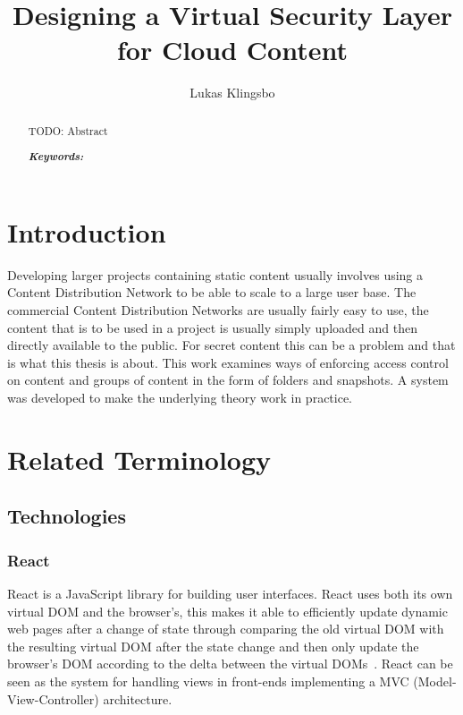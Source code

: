 \documentclass[a4paper,12pt]{article}
\title{\textbf{Designing a Virtual Security Layer for Cloud Content}}
\author{Lukas Klingsbo}
\providecommand{\keywords}[1]{\textbf{\textit{Keywords: }} #1}
\begin{document}
\maketitle
%

\setcounter{page}{2}

%
\begin{abstract}
    TODO: Abstract

\keywords{}
\end{abstract}

\newpage\null\thispagestyle{empty}\newpage

\setcounter{tocdepth}{3}
\tableofcontents

\clearpage
{}
\setcounter{page}{1}
\section{Introduction}
Developing larger projects containing static content usually involves using a Content Distribution Network 
to be able to scale to a large user base. The commercial Content Distribution Networks are usually fairly easy to use, 
the content that is to be used in a project is usually simply uploaded and then directly available to the public. 
For secret content this can be a problem and that is what this thesis is about. This work examines ways of enforcing 
access control on content and groups of content in the form of folders and snapshots. A system was developed to make 
the underlying theory work in practice. 

\newpage
\section{Related Terminology}
\subsection{Technologies}
\subsubsection{React}
React is a JavaScript library for building user interfaces. React uses both its own virtual DOM and the browser's, 
this makes it able to efficiently update dynamic web pages after a change of state through comparing the old virtual 
DOM with the resulting virtual DOM after the state change and then only update the browser's DOM according to the 
delta between the virtual DOMs~\cite{REACT}. React can be seen as the system for handling views in front-ends 
implementing a MVC (Model-View-Controller) architecture.
\end{document}
